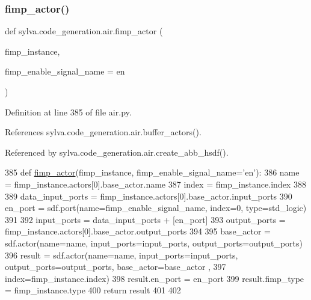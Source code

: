 \mbox{\label{namespacesylva_1_1code__generation_1_1air_a5a82ebeeb6def57b9dc6784ab9cd43f4}} 
\subsubsection{\texorpdfstring{fimp\+\_\+actor()}{fimp\_actor()}}
{\footnotesize\ttfamily def sylva.\+code\+\_\+generation.\+air.\+fimp\+\_\+actor (\begin{DoxyParamCaption}\item[{}]{fimp\+\_\+instance,  }\item[{}]{fimp\+\_\+enable\+\_\+signal\+\_\+name = {\ttfamily \textquotesingle{}en\textquotesingle{}} }\end{DoxyParamCaption})}



Definition at line 385 of file air.\+py.



References sylva.\+code\+\_\+generation.\+air.\+buffer\+\_\+actors().



Referenced by sylva.\+code\+\_\+generation.\+air.\+create\+\_\+abb\+\_\+hsdf().


\begin{DoxyCode}
385 \textcolor{keyword}{def }\hyperlink{namespacesylva_1_1code__generation_1_1air_a5a82ebeeb6def57b9dc6784ab9cd43f4}{fimp\_actor}(fimp\_instance, fimp\_enable\_signal\_name='en'):
386     name = fimp\_instance.actors[0].base\_actor.name
387     index = fimp\_instance.index
388 
389     data\_input\_ports = fimp\_instance.actors[0].base\_actor.input\_ports
390     en\_port = sdf.port(name=fimp\_enable\_signal\_name, index=0, type=std\_logic)
391 
392     input\_ports = data\_input\_ports + [en\_port]
393     output\_ports = fimp\_instance.actors[0].base\_actor.output\_ports
394 
395     base\_actor = sdf.actor(name=name, input\_ports=input\_ports, output\_ports=output\_ports)
396     result = sdf.actor(name=name, input\_ports=input\_ports, output\_ports=output\_ports, base\_actor=base\_actor
      ,
397                        index=fimp\_instance.index)
398     result.en\_port = en\_port
399     result.fimp\_type = fimp\_instance.type
400     \textcolor{keywordflow}{return} result
401 
402 
\end{DoxyCode}
\mbox{\label{namespacesylva_1_1code__generation_1_1air_a2ea6ae18c1f30dcbc16f01d32d092979}} 
